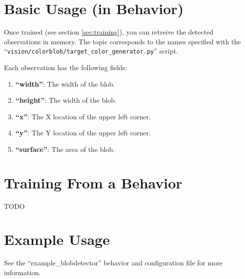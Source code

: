 \documentclass[a4paper, 10pt]{article}
\begin{document}
\section{Basic Usage (in Behavior)}

Once trained (see section \ref{sec:training}), you can retreive the detected observations in memory.
The topic corresponds to the names specified with the ``\lstinline{vision/colorblob/target_color_generator.py}'' script.

Each observation has the following fields:
\begin{enumerate}
    \item[\textbf{``width''}:] The width of the blob.
    \item[\textbf{``height''}:] The width of the blob.
    \item[\textbf{``x''}:] The X location of the upper left corner.
    \item[\textbf{``y''}:] The Y location of the upper left corner.
    \item[\textbf{``surface''}:] The area of the blob.
\end{enumerate}

\section{Training From a Behavior}

TODO

\section{Example Usage}

See the ``example\_blobdetector'' behavior and configuration file for more information.
\end{document}
